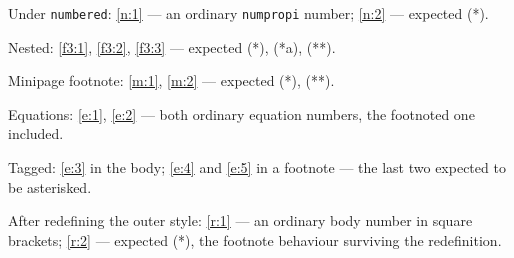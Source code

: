 \documentclass{article}
\begin{document}
Under \texttt{numbered}: \ref{n:1} --- an ordinary \texttt{numpropi} number;
\ref{n:2} --- expected (*).

Nested: \ref{f3:1}, \ref{f3:2}, \ref{f3:3} --- expected (*), (*a), (**).

Minipage footnote: \ref{m:1}, \ref{m:2} --- expected (*), (**).

Equations: \ref{e:1}, \ref{e:2} --- both ordinary equation numbers, the
footnoted one included.

Tagged: \ref{e:3} in the body; \ref{e:4} and \ref{e:5} in a footnote ---
the last two expected to be asterisked.

After redefining the outer style: \ref{r:1} --- an ordinary body number in
square brackets; \ref{r:2} --- expected (*), the footnote behaviour surviving
the redefinition.
\end{document}
